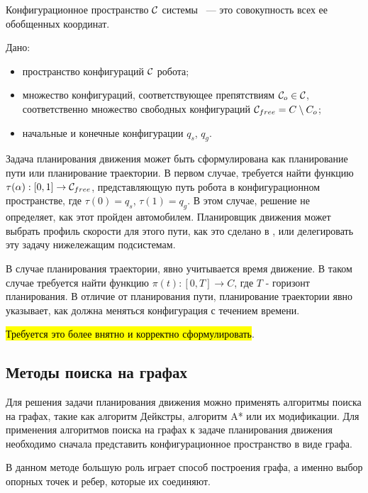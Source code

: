 Конфигурационное пространство $\mathcal{C}$ системы ~--- это совокупность всех ее обобщенных координат.

Дано:
\begin{itemize}
    \item пространство конфигураций $\mathcal{C}$ робота;
    \item множество конфигураций, соответствующее препятствиям $\mathcal{C}_o \in \mathcal{C}$, соответственно
          множество свободных конфигураций $\mathcal{C}_{free} = C \setminus C_o$;
    \item начальные и конечные конфигурации $q_s$, $q_g$.
\end{itemize}

Задача планирования движения может быть сформулирована как планирование пути или планирование траектории.
В первом случае, требуется найти функцию $\tau(\alpha): [0,1] \rightarrow \mathcal{C}_{free}$, представляющую путь робота в
конфигурационном пространстве, где $\tau(0)=q_s$, $\tau(1)=q_g$. В этом случае, решение не определяет, как этот пройден
автомобилем. Планировщик движения может выбрать профиль скорости для этого пути, как это сделано в \cite{darpa_boss},
или делегировать эту задачу нижележащим подсистемам.

В случае планирования траектории, явно учитывается время движение. В таком случае требуется найти функцию
$\pi(t) : [0, T] \rightarrow C$, где $T$ - горизонт планирования. В отличие от планирования пути, планирование
траектории явно указывает, как должна меняться конфигурация с течением времени.

\hl{Требуется это более внятно и корректно сформулировать}.

\subsection{Методы поиска на графах}
Для решения задачи планирования движения можно применять алгоритмы поиска на графах, такие как
алгоритм Дейкстры, алгоритм A* или их модификации. Для применения алгоритмов поиска на графах к задаче
планирования движения необходимо сначала представить конфигурационное пространство в виде графа.

В данном методе большую роль играет способ построения графа, а именно выбор опорных точек и ребер,
которые их соединяют.

